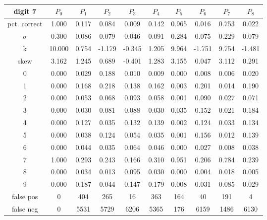 \documentclass{report}
\begin{document}
\begin{tabular}{ | c ||  c | c | c | c | c | c | c | c | c |}
 digit 7 & $P_0$ & $P_1$ & $P_2$ & $P_3$ & $P_4$ & $P_5$ & $P_6$ & $P_7$ & $P_8$ \\
\hline \hline
pct. correct  & 1.000 & 0.117 & 0.084 & 0.009 & 0.142 & 0.965 & 0.016 & 0.753 & 0.022 \\
\hline
$\sigma$ & 0.300& 0.086& 0.079& 0.046& 0.091& 0.284& 0.075& 0.229& 0.079 \\
\hline
k & 10.000& 0.754& -1.179& -0.345& 1.205& 9.964& -1.751& 9.754& -1.481 \\
\hline
skew & 3.162& 1.245& 0.689& -0.401& 1.283& 3.155& 0.047& 3.112& 0.291 \\
\hline
0 & 0.000 & 0.029 & 0.188 & 0.010 & 0.009 & 0.000 & 0.008 & 0.006 & 0.020 \\
\hline
1 & 0.000 & 0.168 & 0.218 & 0.138 & 0.162 & 0.003 & 0.201 & 0.014 & 0.190 \\
\hline
2 & 0.000 & 0.053 & 0.068 & 0.093 & 0.058 & 0.001 & 0.090 & 0.027 & 0.071 \\
\hline
3 & 0.000 & 0.030 & 0.081 & 0.088 & 0.030 & 0.035 & 0.152 & 0.021 & 0.184 \\
\hline
4 & 0.000 & 0.127 & 0.035 & 0.132 & 0.139 & 0.002 & 0.124 & 0.033 & 0.134 \\
\hline
5 & 0.000 & 0.038 & 0.124 & 0.054 & 0.035 & 0.001 & 0.156 & 0.012 & 0.139 \\
\hline
6 & 0.000 & 0.044 & 0.035 & 0.064 & 0.046 & 0.000 & 0.027 & 0.008 & 0.038 \\
\hline
7 & 1.000 & 0.293 & 0.243 & 0.166 & 0.310 & 0.951 & 0.206 & 0.784 & 0.239 \\
\hline
8 & 0.000 & 0.034 & 0.013 & 0.095 & 0.030 & 0.000 & 0.004 & 0.018 & 0.005 \\
\hline
9 & 0.000 & 0.187 & 0.044 & 0.147 & 0.179 & 0.008 & 0.031 & 0.085 & 0.029 \\
\hline
false pos  & 0 & 404 & 265 & 16 & 363 & 164 & 40 & 191 & 4 \\
\hline
false neg  & 0 & 5531 & 5729 & 6206 & 5365 & 176 & 6159 & 1486 & 6130 \\
\hline
\end{tabular}

\vspace{1cm}
\end{document}
